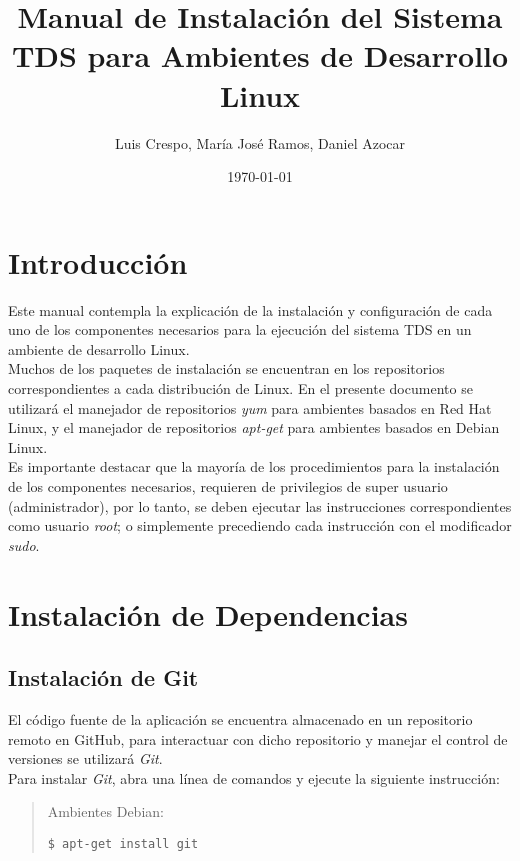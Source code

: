 \documentclass[12pt,a4paper]{article}
\title{Manual de Instalación del Sistema TDS para Ambientes de Desarrollo Linux}
\author{Luis Crespo, María José Ramos, Daniel Azocar}
\date{\today}
\begin{document}
\maketitle

\newpage
\tableofcontents

\newpage
\section{Introducción}
Este manual contempla la explicación de la instalación y configuración de cada uno de los componentes necesarios para la ejecución del sistema TDS en un ambiente de desarrollo Linux. \\

Muchos de los paquetes de instalación se encuentran en los repositorios correspondientes a cada distribución de Linux. En el presente documento se utilizará el manejador de repositorios \emph{yum} para ambientes basados en Red Hat Linux, y el manejador de repositorios \emph{apt-get} para ambientes basados en Debian Linux. \\

Es importante destacar que la mayoría de los procedimientos para la instalación de los componentes necesarios, requieren de privilegios de super usuario (administrador), por lo tanto,  se deben ejecutar las instrucciones correspondientes como usuario \emph{root}; o simplemente precediendo cada instrucción con el modificador \emph{sudo}.

\newpage
\section{Instalación de Dependencias}
\subsection{Instalación de Git}
El código fuente de la aplicación se encuentra almacenado en un repositorio remoto en GitHub, para interactuar con dicho repositorio y manejar el control de versiones se utilizará \emph{Git}. \\

Para instalar \emph{Git}, abra una línea de comandos y ejecute la siguiente instrucción:

\begin{quote}
Ambientes Debian:
\begin{verbatim}
$ apt-get install git
\end{verbatim}
\end{quote}
\end{document}
